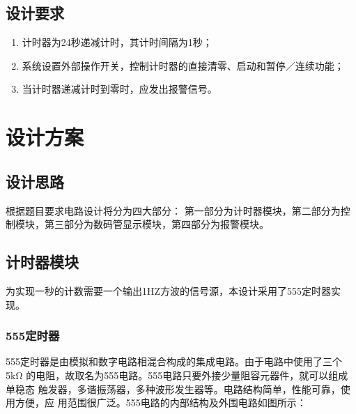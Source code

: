 \documentclass[12p,UTF8]{article}
\begin{document}
\begin{spacing}{1.25}
  \subsection{设计要求}
  \begin{enumerate}
    \item 计时器为24秒递减计时，其计时间隔为1秒；
    \item 系统设置外部操作开关，控制计时器的直接清零、启动和暂停／连续功能；
    \item 当计时器递减计时到零时，应发出报警信号。

  \end{enumerate}
  \section{设计方案}
  \subsection{设计思路}
  根据题目要求电路设计将分为四大部分：
  第一部分为计时器模块，第二部分为控制模块，第三部分为数码管显示模块，第四部分为报警模块。\\[1cm]
  \subsection{计时器模块}
  为实现一秒的计数需要一个输出1HZ方波的信号源，本设计采用了555定时器实现。
  \subsubsection{555定时器}
  555定时器是由模拟和数字电路相混合构成的集成电路。由于电路中使用了三个5kΩ
  的电阻，故取名为555电路。555电路只要外接少量阻容元器件，就可以组成单稳态
  触发器，多谐振荡器，多种波形发生器等。电路结构简单，性能可靠，使用方便，应
  用范围很广泛。555电路的内部结构及外围电路如图所示：


\end{spacing}
\end{document}

